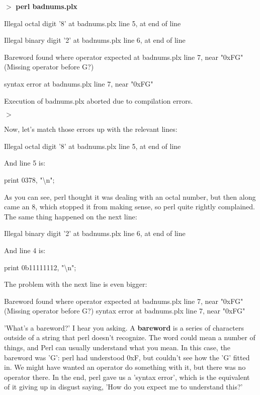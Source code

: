 \documentclass[a4paper,11pt]{book}
\begin{document}
\noindent $>$ \textbf{perl badnums.plx}

\noindent Illegal octal digit '8' at badnums.plx line 5, at end of line

\noindent Illegal binary digit '2' at badnums.plx line 6, at end of line

\noindent Bareword found where operator expected at badnums.plx line 7, near "0xFG" (Missing operator before G?)

\noindent syntax error at badnums.plx line 7, near "0xFG"

\noindent Execution of badnums.plx aborted due to compilation errors.

\noindent $>$

\noindent 

\noindent 

\noindent Now, let's match those errors up with the relevant lines:

\noindent 

\noindent Illegal octal digit '8' at badnums.plx line 5, at end of line

\noindent 

\noindent And line 5 is:

\noindent 

\noindent 

\noindent print 0378, "\textbackslash n";

\noindent 

\noindent As you can see, perl thought it was dealing with an octal number, but then along came an 8, which stopped it from making sense, so perl quite rightly complained. The same thing happened on the next line:

\noindent 

\noindent Illegal binary digit '2' at badnums.plx line 6, at end of line

\noindent 

\noindent And line 4 is:

\noindent 

\noindent print 0b11111112, "\textbackslash n";

\noindent 

\noindent The problem with the next line is even bigger:

\noindent 

\noindent Bareword found where operator expected at badnums.plx line 7, near "0xFG" (Missing operator before G?) syntax error at badnums.plx line 7, near "0xFG"

\noindent 

\noindent 'What's a bareword?' I hear you asking. A \textbf{bareword }is a series of characters outside of a string that perl doesn't recognize. The word could mean a number of things, and Perl can usually understand what you mean. In this case, the bareword was 'G': perl had understood 0xF, but couldn't see how the 'G' fitted in. We might have wanted an operator do something with it, but there was no operator there. In the end, perl gave us a 'syntax error', which is the equivalent of it giving up in disgust saying, 'How do you expect me to understand this?'
\end{document}
